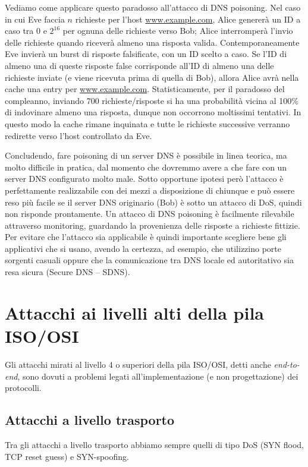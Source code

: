 Vediamo come applicare questo paradosso all'attacco di DNS poisoning. Nel caso in cui Eve faccia $n$ richieste per l'host \url{www.example.com}, Alice genererà un ID a caso tra 0 e $2^{16}$ per ognuna delle richieste verso Bob; Alice interromperà
l'invio delle richieste quando riceverà almeno una risposta valida. Contemporaneamente Eve invierà un burst di risposte falsificate, con un ID scelto a caso. Se l'ID di almeno una di queste risposte false corrisponde all'ID di almeno una delle richieste inviate (e viene ricevuta prima di quella di Bob), allora Alice avrà nella cache una entry per \url{www.example.com}. Statisticamente, per il paradosso del compleanno, inviando 700 richieste/risposte si ha una probabilità vicina al 100\% di indovinare almeno una risposta, dunque non occorrono moltissimi tentativi. In questo modo la cache rimane inquinata e tutte le richieste successive verranno redirette verso l'host controllato da Eve.

Concludendo, fare poisoning di un server DNS è possibile in linea teorica, ma molto difficile in pratica, dal momento che dovremmo avere a che fare con un server DNS configurato molto male. Sotto opportune ipotesi però l'attacco è perfettamente realizzabile con dei mezzi a disposizione di chiunque e può essere reso più facile se il server DNS originario (Bob) è sotto un attacco di DoS, quindi non risponde prontamente. Un attacco di DNS poisoning è facilmente rilevabile attraverso monitoring, guardando la provenienza delle risposte a richieste fittizie. Per evitare che l'attacco sia applicabile è quindi importante scegliere bene gli applicativi che si usano, avendo la certezza, ad esempio, che utilizzino porte sorgenti casuali oppure che la comunicazione tra DNS locale ed autoritativo sia resa sicura (Secure DNS -- SDNS).

\section{Attacchi ai livelli alti della pila ISO/OSI}
Gli attacchi mirati al livello 4 o superiori della pila ISO/OSI, detti anche \textit{end-to-end}, sono dovuti a problemi legati all'implementazione (e non progettazione) dei protocolli.

\subsection{Attacchi a livello trasporto}
Tra gli attacchi a livello trasporto abbiamo sempre quelli di tipo DoS (SYN flood, TCP reset guess) e SYN-spoofing.

